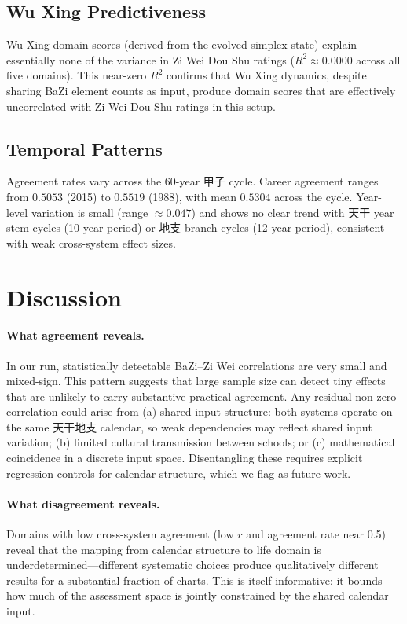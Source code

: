 \documentclass[11pt]{article}
\begin{document}
\subsection{Wu Xing Predictiveness}

Wu Xing domain scores (derived from the evolved simplex state) explain essentially none of the variance in Zi Wei Dou Shu ratings ($R^2 \approx 0.0000$ across all five domains). This near-zero $R^2$ confirms that Wu Xing dynamics, despite sharing BaZi element counts as input, produce domain scores that are effectively uncorrelated with Zi Wei Dou Shu ratings in this setup.

\subsection{Temporal Patterns}

Agreement rates vary across the 60-year 甲子 cycle.
Career agreement ranges from $0.5053$ (2015) to $0.5519$ (1988), with mean $0.5304$ across the cycle. Year-level variation is small (range $\approx 0.047$) and shows no clear trend with 天干 year stem cycles (10-year period) or 地支 branch cycles (12-year period), consistent with weak cross-system effect sizes.

\section{Discussion}

\paragraph{What agreement reveals.}
In our run, statistically detectable BaZi--Zi Wei correlations are very small and mixed-sign.
This pattern suggests that large sample size can detect tiny effects that are unlikely to carry substantive practical agreement.
Any residual non-zero correlation could arise from (a) shared input structure: both systems operate on the same 天干地支 calendar, so weak dependencies may reflect shared input variation; (b) limited cultural transmission between schools; or (c) mathematical coincidence in a discrete input space.
Disentangling these requires explicit regression controls for calendar structure, which we flag as future work.

\paragraph{What disagreement reveals.}
Domains with low cross-system agreement (low $r$ and agreement rate near 0.5) reveal that the mapping from calendar structure to life domain is underdetermined---different systematic choices produce qualitatively different results for a substantial fraction of charts.
This is itself informative: it bounds how much of the assessment space is jointly constrained by the shared calendar input.
\end{document}
